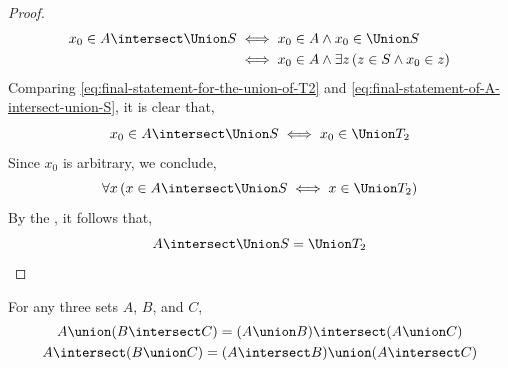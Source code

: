 \begin{proof}
\begin{align}
        x_{0} \in A \intersect \Union S
        &\iff
        x_{0} \in A \land x_{0} \in \Union S \notag \\
        &\iff
        x_{0} \in A \land \exists z \, \mleft( z \in S \land x_{0} \in z \mright)
    \end{align}
    Comparing \eqref{eq:final-statement-for-the-union-of-T2} and \eqref{eq:final-statement-of-A-intersect-union-S},
    it is clear that,
    \begin{equation*}
        x_{0} \in A \intersect \Union S \iff x_{0} \in \Union T_{2}
    \end{equation*}
    Since \( x_{0} \) is arbitrary, we conclude,
    \begin{equation*}
        \forall x \, \mleft( x \in A \intersect \Union S \iff x \in \Union T_{2}  \mright)
    \end{equation*}
    By the , it follows that,
    \begin{equation*}
        A \intersect \Union S = \Union T_{2} \qedhere
    \end{equation*}
\end{proof}

\begin{thm}
    \label{set-identities:distributive-laws}
    For any three sets \( A \), \( B \), and \( C \),
    \begin{gather*}
        A \union \mleft( B \intersect C \mright)
        = \mleft( A \union B \mright) \intersect \mleft( A \union C \mright)\\
        A \intersect \mleft( B \union C \mright)
        = \mleft( A \intersect B \mright) \union \mleft( A \intersect C \mright)
    \end{gather*}
\end{thm}

